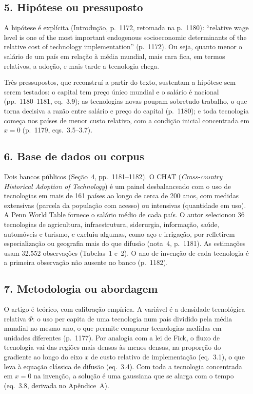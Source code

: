 \subsection*{5. Hipótese ou pressuposto}
A hipótese é explícita (Introdução, p.~1172, retomada na p.~1180): ``relative wage level is one of
the most important endogenous socioeconomic determinants of the relative cost of technology
implementation'' (p.~1172). Ou seja, quanto menor o salário de um país em relação à média mundial,
mais cara fica, em termos relativos, a adoção, e mais tarde a tecnologia chega.

Três pressupostos, que reconstruí a partir do texto, sustentam a hipótese sem serem testados: o
capital tem preço único mundial e o salário é nacional (pp.~1180--1181, eq.~3.9); as tecnologias
novas poupam sobretudo trabalho, o que torna decisiva a razão entre salário e preço do capital
(p.~1180); e toda tecnologia começa nos países de menor custo relativo, com a condição inicial
concentrada em $x=0$ (p.~1179, eqs.~3.5--3.7).

\subsection*{6. Base de dados ou corpus}
Dois bancos públicos (Seção~4, pp.~1181--1182). O CHAT (\emph{Cross-country Historical Adoption of
Technology}) é um painel desbalanceado com o uso de tecnologias em mais de 161 países ao longo de
cerca de 200 anos, com medidas extensivas (parcela da população com acesso) ou intensivas
(quantidade em uso). A Penn World Table fornece o salário médio de cada país. O autor selecionou 36
tecnologias de agricultura, infraestrutura, siderurgia, informação, saúde, automóveis e turismo, e
excluiu algumas, como aço e irrigação, por refletirem especialização ou geografia mais do que
difusão (nota~4, p.~1181). As estimações usam 32.552 observações (Tabelas~1 e~2). O ano de invenção
de cada tecnologia é a primeira observação não ausente no banco (p.~1182).

\subsection*{7. Metodologia ou abordagem}
O artigo é teórico, com calibração empírica. A variável é a densidade tecnológica relativa $\Phi$:
o uso per capita de uma tecnologia num país dividido pela média mundial no mesmo ano, o que permite
comparar tecnologias medidas em unidades diferentes (p.~1177). Por analogia com a lei de Fick, o
fluxo de tecnologia vai das regiões mais densas às menos densas, na proporção do gradiente ao longo
do eixo $x$ de custo relativo de implementação (eq.~3.1), o que leva à equação clássica de difusão
(eq.~3.4). Com toda a tecnologia concentrada em $x=0$ na invenção, a solução é uma gaussiana que se
alarga com o tempo (eq.~3.8, derivada no Apêndice~A).


